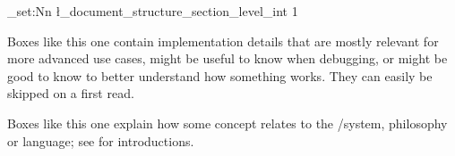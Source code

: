 \ExplSyntaxOn
\int_set:Nn \l_document_structure_section_level_int {1}
\ExplSyntaxOff

\clearpage

{%
  \def\\{:}%
  \tableofcontents
}

\clearpage
{}
	
\fi

\long{}


\begin{dangerbox}
  Boxes like this one contain implementation details that are
  mostly relevant for more advanced use cases, might be useful 
  to know when debugging, or might be good to know to better understand
  how something works. They can easily be skipped on a first read.
\end{dangerbox}

\begin{mmtbox}
  Boxes like this one explain how some \sTeX concept relates to the \mmt/\omdoc system,
  philosophy or language; see \cite{uniformal:on,Kohlhase:OMDoc1.2} for introductions.
\end{mmtbox}


